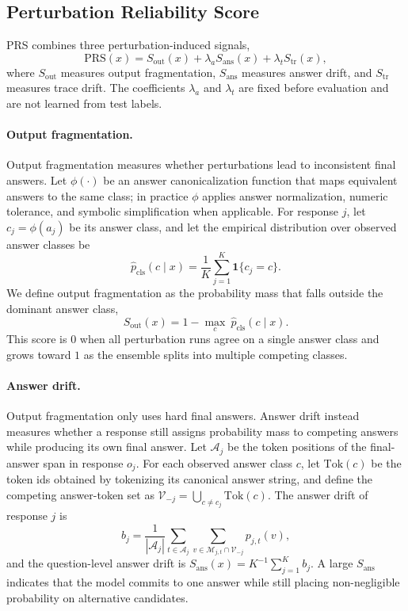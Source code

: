 \documentclass{article} %
\begin{document}
\subsection{Perturbation Reliability Score}
\label{sec:prs-score}

PRS combines three perturbation-induced signals,
\[
\mathrm{PRS}(x)
=
S_{\mathrm{out}}(x)
+
\lambda_a S_{\mathrm{ans}}(x)
+
\lambda_t S_{\mathrm{tr}}(x),
\]
where $S_{\mathrm{out}}$ measures output fragmentation, $S_{\mathrm{ans}}$
measures answer drift, and $S_{\mathrm{tr}}$ measures trace drift. The
coefficients $\lambda_a$ and $\lambda_t$ are fixed before evaluation and are not
learned from test labels.

\paragraph{Output fragmentation.}
Output fragmentation measures whether perturbations lead to inconsistent final
answers. Let $\phi(\cdot)$ be an answer canonicalization function that maps
equivalent answers to the same class; in practice $\phi$ applies answer
normalization, numeric tolerance, and symbolic simplification when applicable.
For response $j$, let $c_j=\phi(a_j)$ be its answer class, and let the empirical
distribution over observed answer classes be
\[
\widehat{p}_{\mathrm{cls}}(c\mid x)
=
\frac{1}{K}
\sum_{j=1}^{K}
\mathbf{1}\{c_j=c\}.
\]
We define output fragmentation as the probability mass that falls outside the
dominant answer class,
\[
S_{\mathrm{out}}(x)
=
1-\max_{c}\ \widehat{p}_{\mathrm{cls}}(c\mid x).
\]
This score is $0$ when all perturbation runs agree on a single answer class and
grows toward $1$ as the ensemble splits into multiple competing classes.

\paragraph{Answer drift.}
Output fragmentation only uses hard final answers. Answer drift instead measures
whether a response still assigns probability mass to competing answers while
producing its own final answer. Let $\mathcal{A}_j$ be the token positions of the
final-answer span in response $o_j$. For each observed answer class $c$, let
$\mathrm{Tok}(c)$ be the token ids obtained by tokenizing its canonical answer
string, and define the competing answer-token set as
$\mathcal{V}_{-j}=\bigcup_{c\neq c_j}\mathrm{Tok}(c)$.
The answer drift of response $j$ is
\[
b_j
=
\frac{1}{|\mathcal{A}_j|}
\sum_{t\in\mathcal{A}_j}
\sum_{v\in \mathcal{M}_{j,t}\cap \mathcal{V}_{-j}}
p_{j,t}(v),
\]
and the question-level answer drift is
$S_{\mathrm{ans}}(x)=K^{-1}\sum_{j=1}^{K}b_j$. A large $S_{\mathrm{ans}}$
indicates that the model commits to one answer while still placing
non-negligible probability on alternative candidates.
\end{document}
